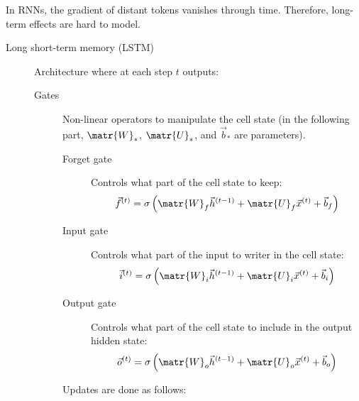 \begin{remark}
    In RNNs, the gradient of distant tokens vanishes through time. Therefore, long-term effects are hard to model.
\end{remark}

\begin{description}
    \item[Long short-term memory (LSTM)] 
        Architecture where at each step $t$ outputs:

        \begin{description}
            \item[Gates]
                Non-linear operators to manipulate the cell state (in the following part, $\matr{W}_*$, $\matr{U}_*$, and $\vec{b}_*$ are parameters).

                \begin{description}
                    \item[Forget gate] 
                        Controls what part of the cell state to keep:
                        \[ \vec{f}^{(t)} = \sigma\left( \matr{W}_f \vec{h}^{(t-1)} + \matr{U}_f \vec{x}^{(t)} + \vec{b}_f \right) \]

                    \item[Input gate] 
                        Controls what part of the input to writer in the cell state:
                        \[ \vec{i}^{(t)} = \sigma\left( \matr{W}_i \vec{h}^{(t-1)} + \matr{U}_i \vec{x}^{(t)} + \vec{b}_i \right) \]

                    \item[Output gate] 
                        Controls what part of the cell state to include in the output hidden state:
                        \[ \vec{o}^{(t)} = \sigma\left( \matr{W}_o \vec{h}^{(t-1)} + \matr{U}_o \vec{x}^{(t)} + \vec{b}_o \right) \]
                    \end{description}

                Updates are done as follows:
        \end{description}


\end{description}
